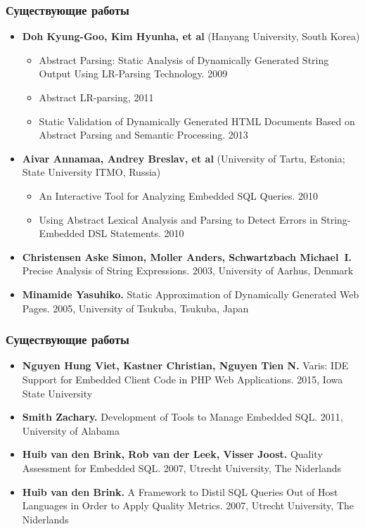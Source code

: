 \documentclass{beamer}
\begin{document}
\begin{frame}
    \transwipe[direction=90]
    \frametitle{Существующие работы}
    \begin{itemize}
        \item \textbf{Doh Kyung-Goo, Kim Hyunha, et al} {\small{(Hanyang University, South Korea)}}
        \begin{itemize}
            \item Abstract Parsing: Static Analysis of Dynamically Generated String Output Using LR-Parsing Technology. 2009
            \item Abstract LR-parsing, 2011
            \item Static Validation of Dynamically Generated HTML Documents Based on Abstract Parsing and Semantic Processing. 2013
        \end{itemize}
        \item \textbf{Aivar Annamaa, Andrey Breslav, et al} (University of Tartu, Estonia; State University ITMO, Russia)
        \begin{itemize}
            \item An Interactive Tool for Analyzing Embedded SQL Queries. 2010
            \item Using Abstract Lexical Analysis and Parsing to Detect Errors in String-Embedded DSL Statements. 2010
        \end{itemize}
        \item \textbf{Christensen Aske Simon, Moller Anders, Schwartzbach Michael~I.} Precise Analysis of String Expressions. 2003, University of Aarhus, Denmark
        \item \textbf{Minamide Yasuhiko.} Static Approximation of Dynamically Generated Web Pages. 2005, University of Tsukuba, Tsukuba, Japan
    \end{itemize}
\end{frame}

\begin{frame}
    \transwipe[direction=90]
    \frametitle{Существующие работы}
    \begin{itemize}
        \item \textbf{Nguyen Hung Viet, Kastner Christian, Nguyen Tien N.} Varis: IDE Support for Embedded Client Code in PHP Web Applications. 2015, Iowa State University

        \item \textbf{Smith Zachary.} Development of Tools to Manage Embedded SQL.  2011, University of Alabama
        \item \textbf{Huib van den Brink, Rob van der Leek, Visser Joost.} Quality Assessment for Embedded SQL. 2007, Utrecht University, The Niderlands
        \item \textbf{Huib van den Brink.} A Framework to Distil SQL Queries Out of Host Languages in Order to Apply Quality Metrics.  2007, Utrecht University, The Niderlands
    \end{itemize}
\end{frame}
\end{document}
